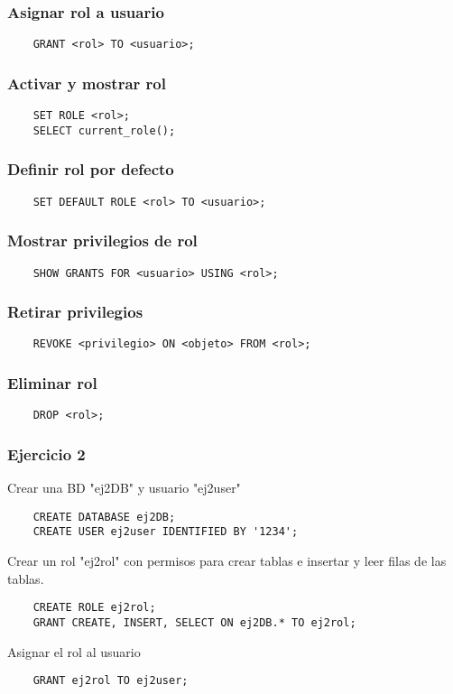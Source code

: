 \documentclass{article}
\begin{document}
\subsubsection{Asignar rol a usuario}
\begin{verbatim}
	GRANT <rol> TO <usuario>;
\end{verbatim}
\subsubsection{Activar y mostrar rol}
\begin{verbatim}
	SET ROLE <rol>;
	SELECT current_role();
\end{verbatim}
\subsubsection{Definir rol por defecto}
\begin{verbatim}
	SET DEFAULT ROLE <rol> TO <usuario>;
\end{verbatim}

\subsubsection{Mostrar privilegios de rol}
\begin{verbatim}
	SHOW GRANTS FOR <usuario> USING <rol>;
\end{verbatim}
\subsubsection{Retirar privilegios}
\begin{verbatim}
	REVOKE <privilegio> ON <objeto> FROM <rol>;
\end{verbatim}
\subsubsection{Eliminar rol}
\begin{verbatim}
	DROP <rol>;
\end{verbatim}
\subsubsection{Ejercicio 2}
Crear una BD "ej2DB" y usuario "ej2user"
\begin{verbatim}
	CREATE DATABASE ej2DB;
	CREATE USER ej2user IDENTIFIED BY '1234';
\end{verbatim}
Crear un rol "ej2rol" con permisos para crear tablas e insertar y leer filas de las tablas.
\begin{verbatim}
	CREATE ROLE ej2rol;
	GRANT CREATE, INSERT, SELECT ON ej2DB.* TO ej2rol;
\end{verbatim}
Asignar el rol al usuario
\begin{verbatim}
	GRANT ej2rol TO ej2user;
\end{verbatim}
\end{document}
